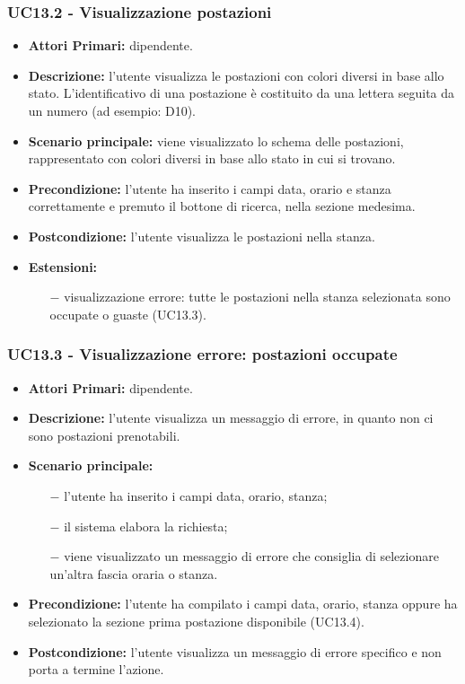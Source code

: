 \subsubsection{ UC13.2 - Visualizzazione postazioni  }
\begin{itemize}
	\item\textbf{Attori Primari:} dipendente.
	\item\textbf{Descrizione:} l’utente visualizza le postazioni con colori diversi in base allo stato. L'identificativo di una postazione è costituito da una lettera seguita da un numero (ad esempio: D10). 
	\item\textbf{Scenario principale:} viene visualizzato lo schema delle postazioni, rappresentato con colori diversi in base allo stato in cui si trovano.
	\item\textbf{Precondizione:} l’utente ha inserito i campi data, orario e stanza correttamente e premuto il bottone di ricerca, nella sezione 
	medesima.
	\item\textbf{Postcondizione:} l’utente visualizza le postazioni nella stanza.
	\item\textbf{Estensioni:}
	\begin{itemize}
		\item[$-$] visualizzazione errore: tutte le postazioni nella stanza selezionata sono occupate o guaste (UC13.3).
	\end{itemize}
\end{itemize}
\subsubsection{ UC13.3 - Visualizzazione errore: postazioni occupate }
\begin{itemize}
	\item\textbf{Attori Primari:} dipendente.
	\item\textbf{Descrizione:} l’utente visualizza un messaggio di errore, in quanto non ci sono postazioni prenotabili.
	\item\textbf{Scenario principale:} 
	\begin{itemize}
		\item[$-$] l’utente ha inserito i campi data, orario, stanza;
		\item[$-$] il sistema elabora la richiesta;
		\item[$-$] viene visualizzato un messaggio di errore che consiglia di selezionare un'altra fascia oraria o stanza.
	\end{itemize}
	\item\textbf{Precondizione:} l’utente ha compilato i campi data, orario, stanza oppure ha selezionato la sezione prima postazione 
	disponibile (UC13.4).
	\item\textbf{Postcondizione:} l’utente visualizza un messaggio di errore specifico e non porta a termine l’azione.
\end{itemize}
